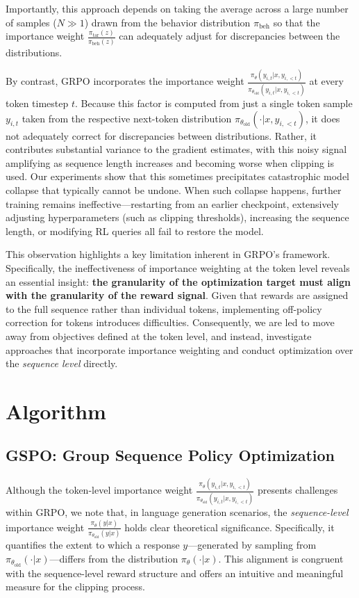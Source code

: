 Importantly, this approach depends on taking the average across a large number of samples ($N \gg 1$) drawn from the behavior distribution $\pi_\text{beh}$ so that the importance weight $\frac{ \pi_\text{tar} (z) }{ \pi_\text{beh} (z)}$ can adequately adjust for discrepancies between the distributions.

By contrast, GRPO incorporates the importance weight $\frac{ \pi_{\theta} (y_{i,t} | x, y_{i,<t}) }{ \pi_{\theta_\text{old}} (y_{i,t} | x,y_{i,<t})}$ at every token timestep $t$. Because this factor is computed from just a single token sample $y_{i,t}$ taken from the respective next-token distribution $\pi_{\theta_\text{old}}( \cdot | x, y_{i, <t})$, it does not adequately correct for discrepancies between distributions. Rather, it contributes substantial variance to the gradient estimates, with this noisy signal amplifying as sequence length increases and becoming worse when clipping is used. Our experiments show that this sometimes precipitates catastrophic model collapse that typically cannot be undone. When such collapse happens, further training remains ineffective—restarting from an earlier checkpoint, extensively adjusting hyperparameters (such as clipping thresholds), increasing the sequence length, or modifying RL queries all fail to restore the model.

This observation highlights a key limitation inherent in GRPO’s framework. Specifically, the ineffectiveness of importance weighting at the token level reveals an essential insight: \textbf{the granularity of the optimization target must align with the granularity of the reward signal}. Given that rewards are assigned to the full sequence rather than individual tokens, implementing off-policy correction for tokens introduces difficulties. Consequently, we are led to move away from objectives defined at the token level, and instead, investigate approaches that incorporate importance weighting and conduct optimization over the \textit{sequence level} directly.

\section{Algorithm}

\subsection{GSPO: Group Sequence Policy Optimization}

Although the token-level importance weight $\frac{ \pi_{\theta} (y_{i,t} | x, y_{i,<t}) }{ \pi_{\theta_\text{old}} (y_{i,t} | x,y_{i,<t})}$ presents challenges within GRPO, we note that, in language generation scenarios, the \textit{sequence-level} importance weight $\frac{ \pi_{\theta} (y | x) }{ \pi_{\theta_\text{old}} (y | x)}$ holds clear theoretical significance. Specifically, it quantifies the extent to which a response $y$—generated by sampling from $\pi_{\theta_\text{old}} (\cdot | x)$—differs from the distribution $\pi_{\theta} (\cdot | x)$. This alignment is congruent with the sequence-level reward structure and offers an intuitive and meaningful measure for the clipping process.

